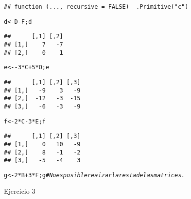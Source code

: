 \documentclass{article}\usepackage[]{graphicx}\usepackage[]{color}
\makeatletter
\newcommand{\hlnum}[1]{\textcolor[rgb]{0.686,0.059,0.569}{#1}}%
\newcommand{\hlcom}[1]{\textcolor[rgb]{0.678,0.584,0.686}{\textit{#1}}}%
\newcommand{\hlopt}[1]{\textcolor[rgb]{0,0,0}{#1}}%
\newcommand{\hlstd}[1]{\textcolor[rgb]{0.345,0.345,0.345}{#1}}%
\newcommand{\hlkwb}[1]{\textcolor[rgb]{0.69,0.353,0.396}{#1}}%
\newenvironment{kframe}{%
 \def\at@end@of@kframe{}%
 \ifinner\ifhmode%
  \def\at@end@of@kframe{\end{minipage}}%
  \begin{minipage}{\columnwidth}%
 \fi\fi%
 \def\FrameCommand##1{\hskip\@totalleftmargin \hskip-\fboxsep
 \colorbox{shadecolor}{##1}\hskip-\fboxsep
     \hskip-\linewidth \hskip-\@totalleftmargin \hskip\columnwidth}%
 \MakeFramed {\advance\hsize-\width
   \@totalleftmargin\z@ \linewidth\hsize
   \@setminipage}}%
 {\par\unskip\endMakeFramed%
 \at@end@of@kframe}
\newenvironment{knitrout}{}{} %
\makeatother
\begin{document}
\begin{knitrout}
\begin{kframe}
{\ttfamily\noindent\bfseries\color{errorcolor}{\#\# Error in A + B: arreglos de dimensón no compatibles}}\begin{verbatim}
## function (..., recursive = FALSE)  .Primitive("c")
\end{verbatim}
\begin{alltt}
\hlstd{d}\hlkwb{<-}\hlstd{D}\hlopt{-}\hlstd{F; d}
\end{alltt}
\begin{verbatim}
##      [,1] [,2]
## [1,]    7   -7
## [2,]    0    1
\end{verbatim}
\begin{alltt}
\hlstd{e}\hlkwb{<-}\hlopt{-}\hlnum{3}\hlopt{*}\hlstd{C}\hlopt{+}\hlnum{5}\hlopt{*}\hlstd{O;e}
\end{alltt}
\begin{verbatim}
##      [,1] [,2] [,3]
## [1,]   -9    3   -9
## [2,]  -12   -3  -15
## [3,]   -6   -3   -9
\end{verbatim}
\begin{alltt}
\hlstd{f}\hlkwb{<-}\hlnum{2}\hlopt{*}\hlstd{C}\hlopt{-}\hlnum{3}\hlopt{*}\hlstd{E;f}
\end{alltt}
\begin{verbatim}
##      [,1] [,2] [,3]
## [1,]    0   10   -9
## [2,]    8   -1   -2
## [3,]   -5   -4    3
\end{verbatim}
\begin{alltt}
\hlstd{g}\hlkwb{<-}\hlnum{2}\hlopt{*}\hlstd{B}\hlopt{+}\hlnum{3}\hlopt{*}\hlstd{F;g} \hlcom{#No es posible reaizar la resta de las matrices.}
\end{alltt}


{\ttfamily\noindent\bfseries\color{errorcolor}{\#\# Error in 2 * B + 3 * F: arreglos de dimensón no compatibles}}

{\ttfamily\noindent\bfseries\color{errorcolor}{\#\# Error in eval(expr, envir, enclos): objeto 'g' no encontrado}}\end{kframe}
\end{knitrout}
Ejercicio 3\\
\\
\end{document}
